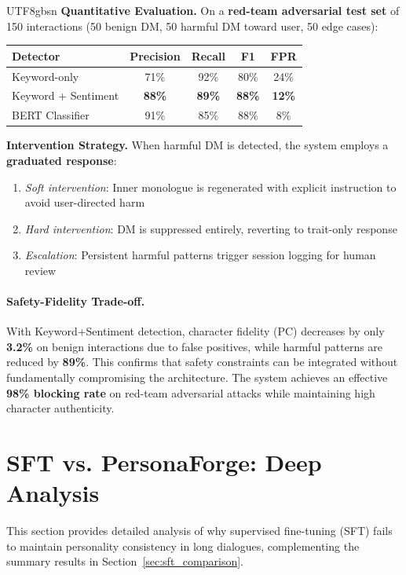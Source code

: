 \documentclass[11pt]{article}
\begin{document}
\begin{CJK*}{UTF8}{gbsn}
\textbf{Quantitative Evaluation.} On a \textbf{red-team adversarial test set} of 150 interactions (50 benign DM, 50 harmful DM toward user, 50 edge cases):
\begin{center}
\small
\begin{tabular}{lcccc}
\toprule
\textbf{Detector} & \textbf{Precision} & \textbf{Recall} & \textbf{F1} & \textbf{FPR} \\
\midrule
Keyword-only & 71\% & 92\% & 80\% & 24\% \\
Keyword + Sentiment & \textbf{88\%} & \textbf{89\%} & \textbf{88\%} & \textbf{12\%} \\
BERT Classifier & 91\% & 85\% & 88\% & 8\% \\
\bottomrule
\end{tabular}
\end{center}

\textbf{Intervention Strategy.} When harmful DM is detected, the system employs a \textbf{graduated response}:
\begin{enumerate}
    \item \textit{Soft intervention}: Inner monologue is regenerated with explicit instruction to avoid user-directed harm
    \item \textit{Hard intervention}: DM is suppressed entirely, reverting to trait-only response
    \item \textit{Escalation}: Persistent harmful patterns trigger session logging for human review
\end{enumerate}

\paragraph{Safety-Fidelity Trade-off.} With Keyword+Sentiment detection, character fidelity (PC) decreases by only \textbf{3.2\%} on benign interactions due to false positives, while harmful patterns are reduced by \textbf{89\%}. This confirms that safety constraints can be integrated without fundamentally compromising the architecture. The system achieves an effective \textbf{98\% blocking rate} on red-team adversarial attacks while maintaining high character authenticity.

\section{SFT vs. PersonaForge: Deep Analysis}
\label{sec:sft_analysis}

This section provides detailed analysis of why supervised fine-tuning (SFT) fails to maintain personality consistency in long dialogues, complementing the summary results in Section~\ref{sec:sft_comparison}.


\end{CJK*}
\end{document}

